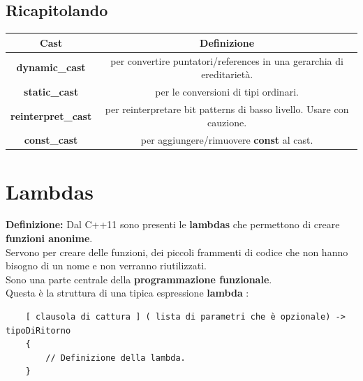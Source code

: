 \subsection{Ricapitolando}

\begin{tabular}{|c|c|}
	\hline
	\textbf{Cast} & \textbf{Definizione} \\
	\hline
	\textbf{dynamic\_cast} & \textsf{\small per convertire puntatori/references in una gerarchia di ereditarietà.} \\
	\hline
	\textbf{static\_cast} & \textsf{\small per le conversioni di tipi ordinari.} \\
	\hline
	\textbf{reinterpret\_cast} & \textsf{\small per reinterpretare bit patterns di basso livello. Usare con cauzione.} \\
	\hline
	\textbf{const\_cast} & \textsf{\small per aggiungere/rimuovere \textbf{const} al cast.} \\
	\hline
\end{tabular}




\section{Lambdas}

\textsf{\small \textbf{Definizione:} Dal C++11 sono presenti le \textbf{lambdas} che permettono di creare \textbf{funzioni anonime}.} \\

\textsf{\small Servono per creare delle funzioni, dei piccoli frammenti di codice che non hanno bisogno di un nome e non verranno riutilizzati. } \\ %

\textsf{\small Sono una parte centrale della \textbf{programmazione funzionale}.} \\

\textsf{\small Questa è la struttura di una tipica espressione \textbf{lambda} :} \\

\begin{lstlisting}
	[ clausola di cattura ] ( lista di parametri che è opzionale) -> tipoDiRitorno
	{
		// Definizione della lambda.
	}
\end{lstlisting}

